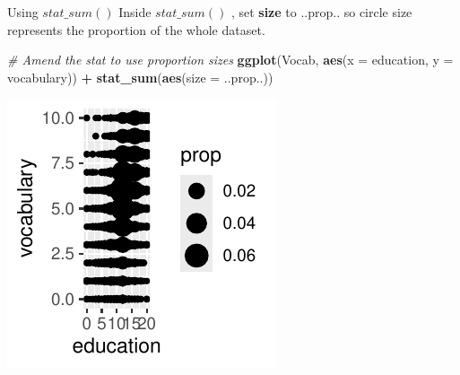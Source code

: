 \documentclass[
  ignorenonframetext,
]{beamer}
\newenvironment{Shaded}{\begin{snugshade}}{\end{snugshade}}
\newcommand{\AttributeTok}[1]{\textcolor[rgb]{0.13,0.29,0.53}{#1}}
\newcommand{\CommentTok}[1]{\textcolor[rgb]{0.56,0.35,0.01}{\textit{#1}}}
\newcommand{\FunctionTok}[1]{\textcolor[rgb]{0.13,0.29,0.53}{\textbf{#1}}}
\newcommand{\NormalTok}[1]{#1}
\newcommand{\SpecialCharTok}[1]{\textcolor[rgb]{0.81,0.36,0.00}{\textbf{#1}}}
\begin{document}
\begin{frame}[fragile]{Using \(stat\_sum()\)}
\label{using-stat_sum-6}
Inside \(stat\_sum()\) , set \textbf{size} to ..prop.. so circle size
represents the proportion of the whole dataset.


\begin{Shaded}
\begin{Highlighting}[]
\CommentTok{\# Amend the stat to use proportion sizes}
\FunctionTok{ggplot}\NormalTok{(Vocab, }\FunctionTok{aes}\NormalTok{(}\AttributeTok{x =}\NormalTok{ education, }\AttributeTok{y =}\NormalTok{ vocabulary)) }\SpecialCharTok{+} \FunctionTok{stat\_sum}\NormalTok{(}\FunctionTok{aes}\NormalTok{(}\AttributeTok{size =}\NormalTok{ ..prop..))}
\end{Highlighting}
\end{Shaded}

\begin{center}\includegraphics[width=0.5\linewidth]{Figs/unnamed-chunk-23-1} \end{center}
\end{frame}
\end{document}

